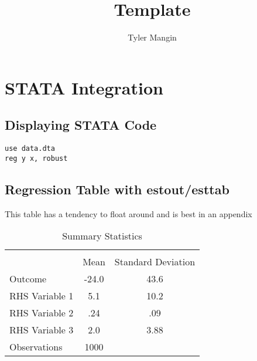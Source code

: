 \documentclass[DIV=calc, paper=a4, fontsize=11pt, article]{scrartcl}	 %
\title{Template}
\author{Tyler Mangin}
\begin{document}
\maketitle %




\section*{STATA Integration}

\subsection*{Displaying STATA Code}

\begin{lstlisting}
use data.dta
reg y x, robust
\end{lstlisting}

\subsection*{Regression Table with estout/esttab}

This table has a tendency to float around and is best in an appendix


%
%
\begin{table}[htbp]\centering
\caption{Summary Statistics\label{statstable}}
\begin{tabular}{l*{1}{cc}}
\toprule
                    &\multicolumn{2}{c}{}     \\
                    &        Mean&          Standard Deviation\\
\midrule
Outcome             &    -24.0&    43.6\\
RHS Variable 1      &    5.1&    10.2\\
RHS Variable 2      &    .24&    .09\\
RHS Variable 3      &    2.0&    3.88\\
\midrule
Observations        &        1000&            \\
\bottomrule
\end{tabular}
\end{table}
\end{document}

